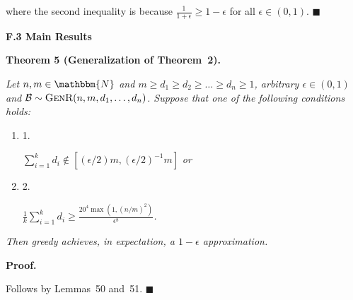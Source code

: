 \documentclass[10pt,a4paper]{article}
\begin{document}
where the second inequality is because $\frac{1}{1+\epsilon}\geq 1-\epsilon$ for all $\epsilon\in(0,1)$.
\ensuremath{\blacksquare}\par






\par\medskip\noindent\textbf{F.3 Main Results}\par





\par\medskip\noindent\textbf{\textbf{Theorem 5}\textbf{ }(Generalization of Theorem 2)\textbf{.}}\par



\emph{Let $n,m\in\mathbbm{N}$ and $m\geq d_{1}\geq d_{2}\geq\dots\geq d_{n}\geq 1$, arbitrary $\epsilon\in(0,1)$ and $\mathcal{B}\sim\textsc{GenR}(n,m,d_{1},\dots,d_{n})$.
Suppose that one of the following conditions holds:}\par


\begin{enumerate}


\item[] 1. 


$\sum_{i=1}^{k}d_{i}\not\in[(\epsilon/2)m,(\epsilon/2)^{-1}m]$\emph{ or}\par




\item[] 2. 


$\frac{1}{k}\sum_{i=1}^{k}d_{i}\geq\frac{20^{4}\max(1,(n/m)^{2})}{\epsilon^{8}}$\emph{.}\par




\end{enumerate}


\emph{Then greedy achieves, in expectation, a $1-\epsilon$ approximation.}\par






\par\medskip\noindent\textbf{Proof.}\par



Follows by Lemmas 50 and 51.
\ensuremath{\blacksquare}\par
\end{document}
